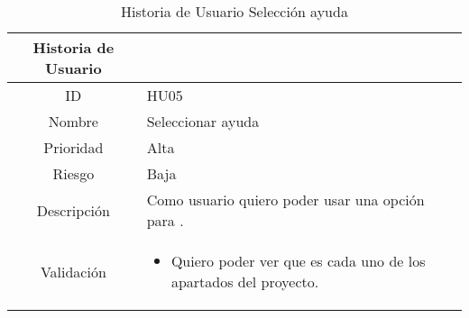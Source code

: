 \begin{table}[h]
	\begin{center}
		\begin{tabular}{| c | p{9cm} |}
			\hline
			
			Historia de Usuario &  \\ \hline
			
			
			ID & HU05 \\
			Nombre & Seleccionar ayuda \\
			Prioridad & Alta \\
			Riesgo & Baja \\
			Descripción & Como usuario quiero poder usar una opción para . \\
			Validación & \begin{itemize}
				\item Quiero poder ver que es cada uno de los apartados del proyecto.
			\end{itemize} \\ \hline
		\end{tabular}
		\caption{Historia de Usuario Selección ayuda}
		\label{tab:historia-usuario-05}
	\end{center}
\end{table}

